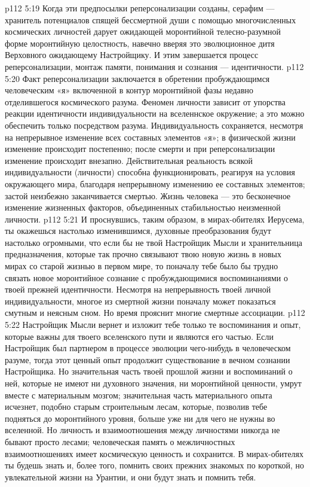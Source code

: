\vs p112 5:19 \bibnobreakspace Когда эти предпосылки реперсонализации созданы, серафим --- хранитель потенциалов спящей бессмертной души с помощью многочисленных космических личностей дарует ожидающей моронтийной телесно\hyp{}разумной форме моронтийную целостность, навечно вверяя это эволюционное дитя Верховного ожидающему Настройщику. И этим завершается процесс реперсонализации, монтаж памяти, понимания и сознания --- идентичности.
\vs p112 5:20 \pc Факт реперсонализации заключается в обретении пробуждающимся человеческим «я» включенной в контур моронтийной фазы недавно отделившегося космического разума. Феномен личности зависит от упорства реакции идентичности индивидуальности на вселеннское окружение; а это можно обеспечить только посредством разума. Индивидуальность сохраняется, несмотря на непрерывное изменение всех составных элементов «я»; в физической жизни изменение происходит постепенно; после смерти и при реперсонализации изменение происходит внезапно. Действительная реальность всякой индивидуальности (личности) способна функционировать, реагируя на условия окружающего мира, благодаря непрерывному изменению ее составных элементов; застой неизбежно заканчивается смертью. Жизнь человека --- это бесконечное изменение жизненных факторов, объединенных стабильностью неизменной личности.
\vs p112 5:21 И проснувшись, таким образом, в мирах\hyp{}обителях Иерусема, ты окажешься настолько изменившимся, духовные преобразования будут настолько огромными, что если бы не твой Настройщик Мысли и хранительница предназначения, которые так прочно связывают твою новую жизнь в новых мирах со старой жизнью в первом мире, то поначалу тебе было бы трудно связать новое моронтийное сознание с пробуждающимися воспоминаниями о твоей прежней идентичности. Несмотря на непрерывность твоей личной индивидуальности, многое из смертной жизни поначалу может показаться смутным и неясным сном. Но время прояснит многие смертные ассоциации.
\vs p112 5:22 Настройщик Мысли вернет и изложит тебе только те воспоминания и опыт, которые важны для твоего вселенского пути и являются его частью. Если Настройщик был партнером в процессе эволюции чего\hyp{}нибудь в человеческом разуме, тогда этот ценный опыт продолжит существование в вечном сознании Настройщика. Но значительная часть твоей прошлой жизни и воспоминаний о ней, которые не имеют ни духовного значения, ни моронтийной ценности, умрут вместе с материальным мозгом; значительная часть материального опыта исчезнет, подобно старым строительным лесам, которые, позволив тебе подняться до моронтийного уровня, больше уже ни для чего не нужны во вселенной. Но личность и взаимоотношения между личностями никогда не бывают просто лесами; человеческая память о межличностных взаимоотношениях имеет космическую ценность и сохранится. В мирах\hyp{}обителях ты будешь знать и, более того, помнить своих прежних знакомых по короткой, но увлекательной жизни на Урантии, и они будут знать и помнить тебя.
